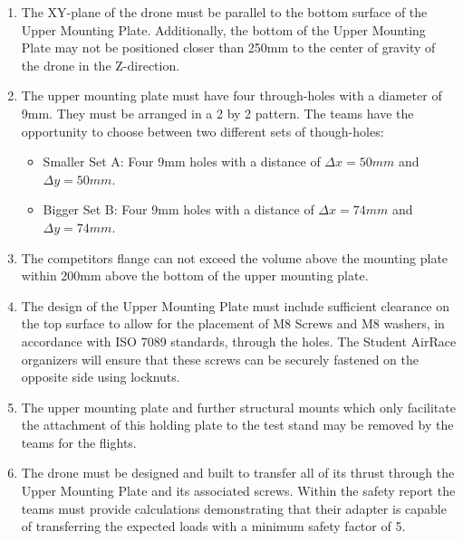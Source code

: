 \documentclass{article}
\begin{document}
\begin{enumerate}
  \item The XY-plane of the drone must be parallel to the bottom surface of the Upper Mounting Plate. Additionally, the bottom of the Upper Mounting Plate may not be positioned closer than 250mm to the center of gravity of the drone in the Z-direction.  
  \item The upper mounting plate must have four through-holes with a diameter of 9mm. They must be arranged in a 2 by 2 pattern. The teams have the opportunity to choose between two different sets of though-holes:
    \begin{itemize}
      \item Smaller Set A: Four 9mm holes with a distance of ${\Delta}x=50mm$ and ${\Delta}y=50mm$.
      \item Bigger Set B: Four 9mm holes with a distance of ${\Delta}x=74mm$ and ${\Delta}y=74mm$.
    \end{itemize}
  \item The competitors flange can not exceed the volume above the mounting plate within 200mm above the bottom of the upper mounting plate. 
  \item The design of the Upper Mounting Plate must include sufficient clearance on the top surface to allow for the placement of M8 Screws and M8 washers, in accordance with ISO 7089 standards, through the holes. The Student AirRace organizers will ensure that these screws can be securely fastened on the opposite side using locknuts.
  \item The upper mounting plate and further structural mounts which only facilitate the attachment of this holding plate to the test stand may be removed by the teams for the flights. 
  \item The drone must be designed and built to transfer all of its thrust through the Upper Mounting Plate and its associated screws. Within the safety report the teams must provide calculations demonstrating that their adapter is capable of transferring the expected loads with a minimum safety factor of 5. \end{enumerate}
\end{document}
